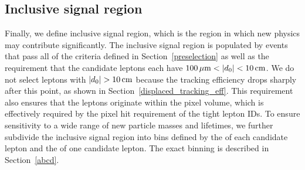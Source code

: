 \subsection{Inclusive signal region}
Finally, we define inclusive signal region, which is the region in which new physics may contribute significantly. The inclusive signal region is populated by events that pass all of the criteria defined in Section~\ref{preselection} as well as the requirement that the candidate leptons each have $100\,\mu\text{m}<\lvert d_0 \rvert<10\,\text{cm}$. We do not select leptons with $\lvert d_0 \rvert>10\,\text{cm}$ because the tracking efficiency drops sharply after this point, as shown in Section~\ref{displaced_tracking_eff}. This requirement also ensures that the leptons originate within the pixel volume, which is effectively required by the pixel hit requirement of the tight lepton IDs. To ensure sensitivity to a wide range of new particle masses and lifetimes, we further subdivide the inclusive signal region into bins defined by the \ad of each candidate lepton and the \pt of one candidate lepton. The exact binning is described in Section~\ref{abcd}.


\pagebreak